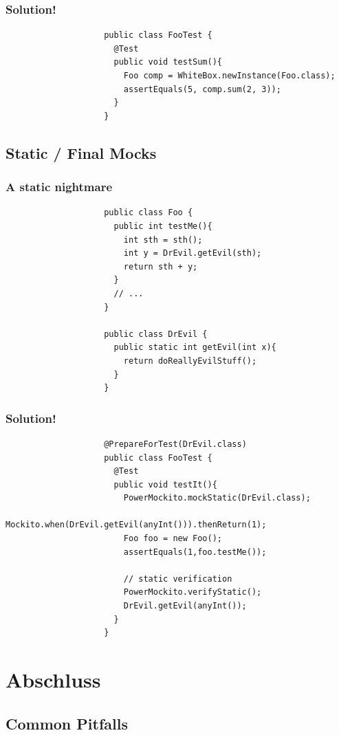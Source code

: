 \documentclass{beamer}
\begin{document}
			\begin{frame}[fragile]
				\frametitle{Solution!}

				\begin{lstlisting}
					public class FooTest {
					  @Test
					  public void testSum(){
					    Foo comp = WhiteBox.newInstance(Foo.class);
					    assertEquals(5, comp.sum(2, 3));
					  }
					}
				\end{lstlisting}
			\end{frame}

		\subsection{Static / Final Mocks}

			\begin{frame}[fragile]
				\frametitle{A static nightmare}

				\begin{lstlisting}
					public class Foo {
					  public int testMe(){
					    int sth = sth();
					    int y = DrEvil.getEvil(sth);	
					    return sth + y;
					  }
					  // ...
					}

					public class DrEvil {
					  public static int getEvil(int x){
					    return doReallyEvilStuff();
					  }
					}
				\end{lstlisting}
			\end{frame}

			\begin{frame}[fragile]
				\frametitle{Solution!}

				\begin{lstlisting}
					@PrepareForTest(DrEvil.class)
					public class FooTest {
					  @Test
					  public void testIt(){
					    PowerMockito.mockStatic(DrEvil.class);
					    Mockito.when(DrEvil.getEvil(anyInt())).thenReturn(1);
					    Foo foo = new Foo();
					    assertEquals(1,foo.testMe());

					    // static verification
					    PowerMockito.verifyStatic();
					    DrEvil.getEvil(anyInt());
					  }
					}
				\end{lstlisting}
			\end{frame}



	\section{Abschluss}

		\subsection{Common Pitfalls}
\end{document}
